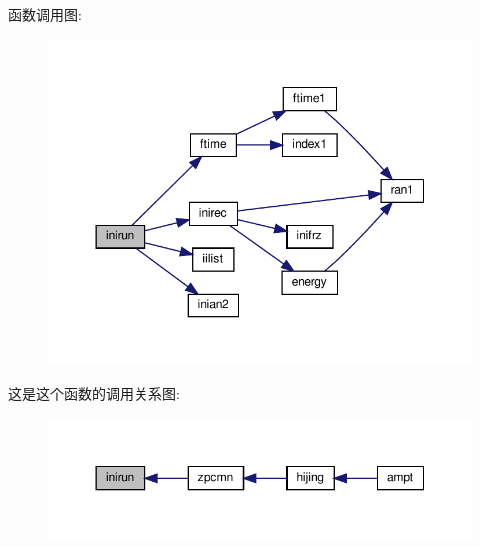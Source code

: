 函数调用图\+:
\nopagebreak
\begin{figure}[H]
\begin{center}
\leavevmode
\includegraphics[width=350pt]{inirun_8f90_a11a85c70de57335cf3725d8b50abf692_cgraph}
\end{center}
\end{figure}
这是这个函数的调用关系图\+:
\nopagebreak
\begin{figure}[H]
\begin{center}
\leavevmode
\includegraphics[width=350pt]{inirun_8f90_a11a85c70de57335cf3725d8b50abf692_icgraph}
\end{center}
\end{figure}
